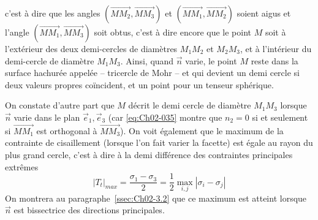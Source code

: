 c'est à dire que les angles $\left( \vec{MM_2},\vec{MM_3} \right)$ et  $\left( \vec{MM_1},\vec{MM_2} \right)$ soient aigus et l'angle $\left( \vec{MM_1}, \vec{MM_3} \right)$ soit obtus, c'est à dire encore que le point $M$ soit à l'extérieur des deux demi-cercles de diamètres $M_1M_2$ et $M_2M_3$, et à l'intérieur du demi-cercle de diamètre $M_1M_3$.
Ainsi, quand $\vec{n}$ varie, le point $M$ reste dans la surface hachurée appelée -- tricercle de Mohr -- et qui devient un demi cercle si deux valeurs propres coïncident, et un point pour un tenseur sphérique.

On constate d'autre part que $M$ décrit le demi cercle de diamètre $M_1M_3$ lorsque $\vec{n}$ varie dans le plan $\vec{e}_1, \vec{e}_3$ (car \eqref{eq:Ch02-035} montre que $n_2 = 0$  si et seulement si $\vec{MM_1}$ est orthogonal à $\vec{MM_3}$).
On voit également que le maximum de la contrainte de cisaillement (lorsque l'on fait varier la facette) est égale au rayon du plus grand cercle, c'est à dire à la demi différence des contraintes principales extrêmes
\begin{equation}
    |T_t|_{max} = \frac{\sigma_1 - \sigma_3}{2} = \frac{1}{2} \max_{i,j} |\sigma_i - \sigma_j|
    \label{eq:Ch02-039}
\end{equation}
On montrera au paragraphe~\ref{ssec:Ch02-3.2} que ce maximum est atteint lorsque $\vec{n}$ est bissectrice des directions principales.  


